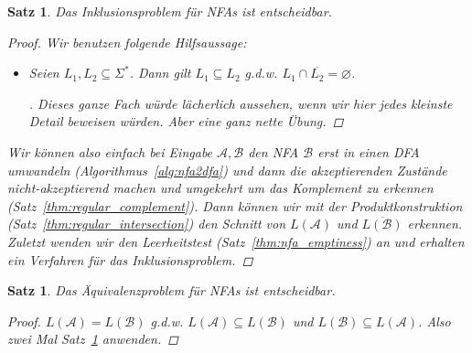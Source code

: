 \documentclass[11pt, a4paper]{article}
\theoremstyle{definition}
\theoremstyle{plain}
\newtheorem{theorem}[definition]{Satz}
\numberwithin{equation}{section}
\newenvironment{subproof}[1][\proofname]{\renewcommand{\qedsymbol}{$\blacksquare$}\vspace{-3ex}\begin{proof}[#1]}{\end{proof}\vspace{-3ex}}
\newcommand{\comp}[1]{\overline{#1}}
\let\emptyset\varnothing
\begin{document}
\begin{theorem}\label{thm:nfa_inclusion}
	Das Inklusionsproblem für NFAs ist entscheidbar.
	\begin{proof}
		Wir benutzen folgende Hilfsaussage:
		\begin{itemize}
			\item[] Seien $L_1, L_2 \subseteq \Sigma^\ast$. Dann gilt $L_1 \subseteq L_2$ g.d.w. $L_1 \cap \comp{L_2} = \emptyset$.
				\begin{subproof}
					Dieses ganze Fach würde lächerlich aussehen, wenn wir hier jedes kleinste Detail beweisen würden. Aber eine ganz nette Übung.
				\end{subproof}
		\end{itemize}
		Wir können also einfach bei Eingabe $\mathcal{A}, \mathcal{B}$ den NFA $\mathcal{B}$ erst in einen DFA umwandeln (Algorithmus~\ref{alg:nfa2dfa}) und dann die akzeptierenden Zustände nicht-akzeptierend machen und umgekehrt um das Komplement zu erkennen (Satz~\ref{thm:regular_complement}). Dann können wir mit der Produktkonstruktion (Satz~\ref{thm:regular_intersection}) den Schnitt von $L(\mathcal{A})$ und $\comp{L(\mathcal{B})}$ erkennen. Zuletzt wenden wir den Leerheitstest (Satz~\ref{thm:nfa_emptiness}) an und erhalten ein Verfahren für das Inklusionsproblem.
	\end{proof}
\end{theorem}
\begin{theorem}\label{thm:nfa_equivalence}
	Das Äquivalenzproblem für NFAs ist entscheidbar.
	\begin{proof}
		$L(\mathcal{A}) = L(\mathcal{B})$ g.d.w. $L(\mathcal{A}) \subseteq L(\mathcal{B})$ und $L(\mathcal{B}) \subseteq L(\mathcal{A})$. Also zwei Mal Satz~\ref{thm:nfa_inclusion} anwenden.
	\end{proof}
\end{theorem}
\end{document}
